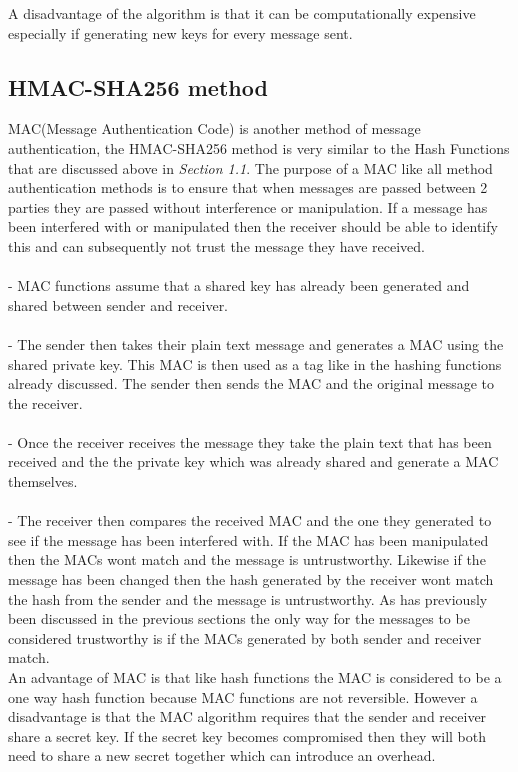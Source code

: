\documentclass[a4paper, twoside, 11pt]{article}
\begin{document}
A disadvantage of the algorithm is that it can be computationally expensive especially if generating new keys for every message sent.


\subsection{HMAC-SHA256 method}
MAC(Message Authentication Code) is another method of message authentication, the HMAC-SHA256 method is very similar to the Hash Functions that are discussed above in \textit{Section 1.1}. The purpose of a MAC like all method authentication methods is to ensure that when messages are passed between 2 parties they are passed without interference or manipulation. If a message has been interfered with or manipulated then the receiver should be able to identify this and can subsequently not trust the message they have received.\\
\\
 - MAC functions assume that a shared key has already been generated and shared between sender and receiver. \\
\\
 - The sender then takes their plain text message and generates a MAC  using the shared private key. This MAC is then used as a tag like in the hashing functions already discussed. The sender then sends the MAC and the original message to the receiver.\\
\\
 - Once the receiver receives the message they take the plain text that has been received and the  the private key which was already shared and generate a MAC themselves.\\
\\
 - The receiver then compares the received MAC and the one they generated to see if the message has been interfered with. If the MAC has been manipulated then the MACs wont match and the message is untrustworthy. Likewise if the message has been changed then the hash generated by the receiver wont match the hash from the sender and the message is untrustworthy. As has previously been discussed in the previous sections the only way for the messages to be considered trustworthy is if the MACs generated by both sender and receiver match. \\

An advantage of MAC is that like hash functions the MAC is considered to be a one way hash function because MAC functions are not reversible. However a disadvantage is that the MAC algorithm requires that the sender and receiver share a secret key. If the secret key becomes compromised then they will both need to share a new secret together which can introduce an overhead. 
\end{document}
